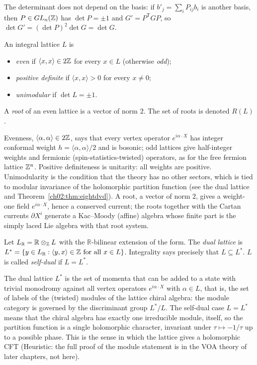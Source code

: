 The determinant does not depend on the basis: if $b'_j=\sum_i P_{ij}b_i$ is another basis, then
$P\in GL_n({\mathbb{Z}})$ has $\det P=\pm1$ and $G'=P^{\mathsf T}GP$, so $\det G'=(\det P)^2\det G=\det G$.

\begin{definition}\label{ch02:def:props}
An integral lattice $L$ is
\begin{itemize}
\item \emph{even} if $\langle x,x\rangle\in2{\mathbb{Z}}$ for every $x\in L$ (otherwise \emph{odd});
\item \emph{positive definite} if $\langle x,x\rangle>0$ for every $x\neq0$;
\item \emph{unimodular} if $\det L=\pm1$.
\end{itemize}
A \emph{root} of an even lattice is a vector of norm $2$.  The set of roots is denoted $R(L)$.
\end{definition}
\begin{physics}
Evenness, $\langle\alpha,\alpha\rangle\in2{\mathbb{Z}}$, says that every vertex operator $e^{i\alpha\cdot X}$ has integer conformal weight $h=\langle\alpha,\alpha\rangle/2$ and is bosonic; odd lattices give half-integer weights and fermionic (spin-statistics-twisted) operators, as for the free fermion lattice ${\mathbb{Z}}^n$. Positive definiteness is unitarity: all weights are positive. Unimodularity is the condition that the theory has no other sectors, which is tied to modular invariance of the holomorphic partition function (see the dual lattice and Theorem~\ref{ch02:thm:eightdvd}). A root, a vector of norm $2$, gives a weight-one field $e^{i\alpha\cdot X}$, hence a conserved current; the roots together with the Cartan currents $\partial X^i$ generate a Kac--Moody (affine) algebra whose finite part is the simply laced Lie algebra with that root system.
\end{physics}

\begin{definition}\label{ch02:def:dual}
Let $L_{\mathbb{R}}=\mathbb{R}\otimes_{{\mathbb{Z}}} L$ with the $\mathbb{R}$-bilinear extension of the form.
The \emph{dual lattice} is $L^*=\{y\in L_{\mathbb{R}}:\langle y,x\rangle\in{\mathbb{Z}}\text{ for all }x\in
L\}$.  Integrality says precisely that $L\subseteq L^*$.  $L$ is called \emph{self-dual} if
$L=L^*$.
\end{definition}
\begin{physics}
The dual lattice $L^*$ is the set of momenta that can be added to a state with trivial monodromy against all vertex operators $e^{i\alpha\cdot X}$ with $\alpha\in L$, that is, the set of labels of the (twisted) modules of the lattice chiral algebra: the module category is governed by the discriminant group $L^*/L$. The self-dual case $L=L^*$ means that the chiral algebra has exactly one irreducible module, itself, so the partition function is a single holomorphic character, invariant under $\tau\mapsto-1/\tau$ up to a possible phase. This is the sense in which the lattice gives a holomorphic CFT (Heuristic: the full proof of the module statement is in the VOA theory of later chapters, not here).
\end{physics}

